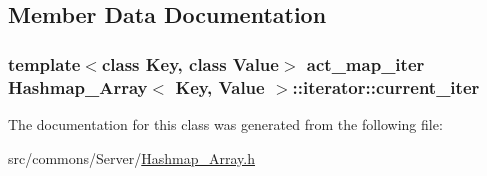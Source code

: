 \subsection{Member Data Documentation}
\hypertarget{class_hashmap___array_1_1iterator_a5cf1825a2535c734d4b819b31f1f957c}{
\subsubsection[{current\_\-iter}]{\setlength{\rightskip}{0pt plus 5cm}template$<$class Key, class Value$>$ {\bf act\_\-map\_\-iter} {\bf Hashmap\_\-Array}$<$ Key, Value $>$::{\bf iterator::current\_\-iter}}}
\label{class_hashmap___array_1_1iterator_a5cf1825a2535c734d4b819b31f1f957c}


The documentation for this class was generated from the following file:\begin{DoxyCompactItemize}
\item 
src/commons/Server/\hyperlink{_hashmap___array_8h}{Hashmap\_\-Array.h}\end{DoxyCompactItemize}
